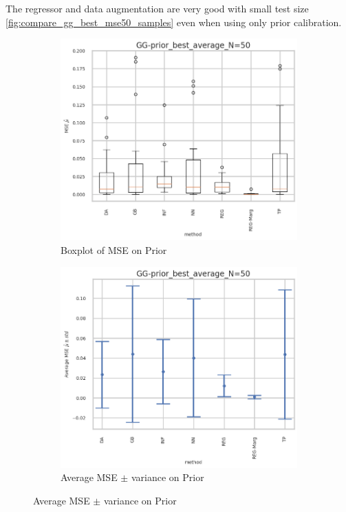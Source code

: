The regressor and data augmentation are very good with small test size \autoref{fig:compare_gg_best_mse50_samples} even when using only prior calibration.

\begin{figure}[ht!]
  \centering
  \begin{subfigure}[t]{0.49\linewidth}
    \includegraphics[width=\linewidth]{COMPARE/GG-prior/BEST_MSE/GG-prior_best_average_N=50-boxplot_mse.png}
    \caption{Boxplot of MSE on Prior}
  \end{subfigure}%
  \hfill
  \begin{subfigure}[t]{0.49\linewidth}
    \includegraphics[width=\linewidth]{COMPARE/GG-prior/BEST_MSE/GG-prior_best_average_N=50-errplot_mse.png}
    \caption{Average MSE $\pm$ variance on Prior}
  \end{subfigure}


\end{figure}
